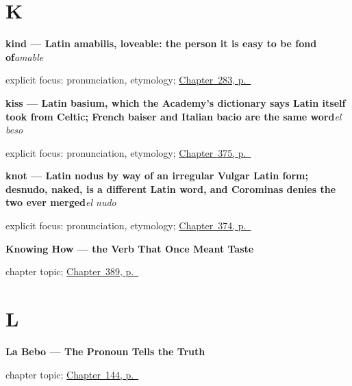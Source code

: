 \section*{K}

\noindent\begin{minipage}[t]{\linewidth}
\raggedright
\textbf{kind — Latin amabilis, loveable: the person it is easy to be fond of}\enspace\emph{amable}\par
\footnotesize explicit focus: pronunciation, etymology; \hyperref[ch:cortesia]{Chapter~283, p.~\pageref*{ch:cortesia}}
\end{minipage}\par\smallskip

\noindent\begin{minipage}[t]{\linewidth}
\raggedright
\textbf{kiss — Latin basium, which the Academy's dictionary says Latin itself took from Celtic; French baiser and Italian bacio are the same word}\enspace\emph{el beso}\par
\footnotesize explicit focus: pronunciation, etymology; \hyperref[ch:la-una-y-el-labio]{Chapter~375, p.~\pageref*{ch:la-una-y-el-labio}}
\end{minipage}\par\smallskip

\noindent\begin{minipage}[t]{\linewidth}
\raggedright
\textbf{knot — Latin nodus by way of an irregular Vulgar Latin form; desnudo, naked, is a different Latin word, and Corominas denies the two ever merged}\enspace\emph{el nudo}\par
\footnotesize explicit focus: pronunciation, etymology; \hyperref[ch:el-lapiz-y-el-cepillo]{Chapter~374, p.~\pageref*{ch:el-lapiz-y-el-cepillo}}
\end{minipage}\par\smallskip

\noindent\begin{minipage}[t]{\linewidth}
\raggedright
\textbf{Knowing How --- the Verb That Once Meant Taste}\par
\footnotesize chapter topic; \hyperref[ch:saber]{Chapter~389, p.~\pageref*{ch:saber}}
\end{minipage}\par\smallskip

\section*{L}

\noindent\begin{minipage}[t]{\linewidth}
\raggedright
\textbf{La Bebo --- The Pronoun Tells the Truth}\par
\footnotesize chapter topic; \hyperref[ch:pronoun-evidence]{Chapter~144, p.~\pageref*{ch:pronoun-evidence}}
\end{minipage}\par\smallskip

